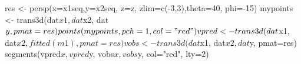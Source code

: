 \begin{Schunk}
\begin{Sinput}
 res <- persp(x=x1seq,y=x2seq, z=z, zlim=c(-3,3),theta=40, phi=-15)
 mypoints <- trans3d(dat$x1, dat$x2, dat$y, pmat = res)
 points(mypoints, pch =1, col="red")
 vpred <- trans3d(dat$x1, dat$x2, fitted(m1),   pmat=res) 
 vobs <- trans3d(dat$x1, dat$x2, dat$y,   pmat=res) 
 segments(vpred$x, vpred$y, vobs$x, vobs$y, col="red", lty=2)
\end{Sinput}
\end{Schunk}
